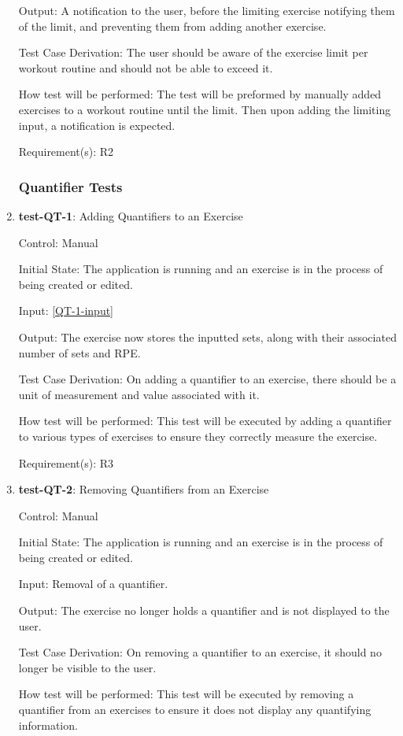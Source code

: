 \documentclass[12pt, titlepage]{article}
\begin{document}
\begin{enumerate}
		Output: A notification to the user, before the limiting exercise notifying them of the limit, and preventing them from adding another exercise.
		
		Test Case Derivation: The user should be aware of the exercise limit per workout routine and should not be able to exceed it.
		
		How test will be performed: The test will be preformed by manually added exercises to a workout routine until the limit. Then upon adding the limiting input, a notification is expected.
		
		Requirement(s): R2
		
		\subsubsection{Quantifier Tests}
		\item{\textbf{test-QT-1}}: Adding Quantifiers to an Exercise
		
		Control: Manual
		
		Initial State: The application is running and an exercise is in the process of being created or edited.
		
		Input: \ref{QT-1-input}
		
		Output: The exercise now stores the inputted sets, along with their associated number of sets and RPE.
		
		Test Case Derivation: On adding a quantifier to an exercise, there should be a unit of measurement and value associated with it.
		
		How test will be performed: This test will be executed by adding a quantifier to various types of exercises to ensure they correctly measure the exercise.
		
		Requirement(s): R3
		
		\item{\textbf{test-QT-2}}: Removing Quantifiers from an Exercise
		
		Control: Manual
		
		Initial State: The application is running and an exercise is in the process of being created or edited.
		
		Input: Removal of a quantifier.
		
		Output: The exercise no longer holds a quantifier and is not displayed to the user.
		
		Test Case Derivation: On removing a quantifier to an exercise, it should no longer be visible to the user.
		
		How test will be performed: This test will be executed by removing a quantifier from an exercises to ensure it does not display any quantifying information.
		

\end{enumerate}
\end{document}
